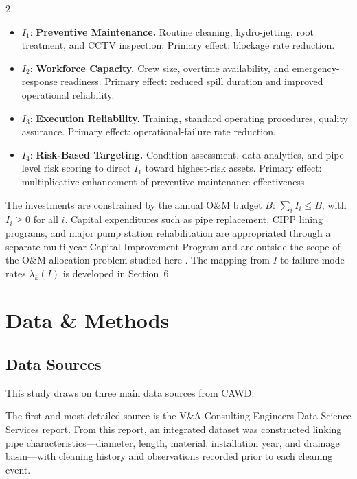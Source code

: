 \documentclass[10pt]{article}
\begin{document}
\begin{multicols}{2}
\begin{itemize}[leftmargin=*]
    \item $I_1$: \textbf{Preventive Maintenance.} Routine cleaning,
    hydro-jetting, root treatment, and CCTV inspection. Primary effect:
    blockage rate reduction.
    \item $I_2$: \textbf{Workforce Capacity.} Crew size, overtime
    availability, and emergency-response readiness. Primary effect:
    reduced spill duration and improved operational reliability.
    \item $I_3$: \textbf{Execution Reliability.} Training, standard
    operating procedures, quality assurance. Primary effect:
    operational-failure rate reduction.
    \item $I_4$: \textbf{Risk-Based Targeting.} Condition assessment,
    data analytics, and pipe-level risk scoring to direct $I_1$ toward
    highest-risk assets. Primary effect: multiplicative enhancement of
    preventive-maintenance effectiveness.
\end{itemize}
 
The investments are constrained by the annual O\&M budget $B$:
$\sum_i I_i \le B$, with $I_i \ge 0$ for all $i$. Capital expenditures
such as pipe replacement, CIPP lining programs, and major pump station
rehabilitation are appropriated through a separate multi-year Capital
Improvement Program and are outside the scope of the O\&M allocation
problem studied here \citep{cawd_budget2025}. The mapping from $I$ to
failure-mode rates $\lambda_k(I)$ is developed in Section~6.

\section{Data \& Methods}

\subsection{Data Sources}

This study draws on three main data sources from CAWD.
 
The first and most detailed source is the V\&A Consulting Engineers Data
Science Services report. From this report, an integrated dataset was
constructed linking pipe characteristics---diameter, length, material,
installation year, and drainage basin---with cleaning history and
observations recorded prior to each cleaning event. 
 

\end{multicols}
\end{document}
